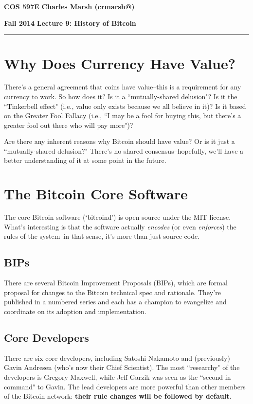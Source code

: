 \documentclass[12pt]{article}
\makeatletter
\newcommand{\myheader}[4]
{\vspace*{-0.5in}
\noindent
{#1} \hfill {#3}

\noindent
{#2} \hfill {#4}

\noindent
\rule[8pt]{\textwidth}{1pt}

\vspace{1ex} 
}  %
\newcommand{\myalgsheader}[0]
{\myheader
{ {\bf{COS 597E}} }
{ {\bf{Fall 2014}} }
{ {\bf{Charles Marsh (crmarsh@)}} }
{ {\bf{Lecture 9: History of Bitcoin}} }
}
\makeatother
\begin{document}
\myalgsheader

\pagestyle{plain}

\section*{Why Does Currency Have Value?}

There's a general agreement that coins have value--this is a requirement for any currency to work. So how does it? Is it a ``mutually-shared delusion"? Is it the ``Tinkerbell effect" (i.e., value only exists because we all believe in it)? Is it based on the Greater Fool Fallacy (i.e., ``I may be a fool for buying this, but there's a greater fool out there who will pay more")?

Are there any inherent reasons why Bitcoin should have value? Or is it just a ``mutually-shared delusion?" There's no shared consensus--hopefully, we'll have a better understanding of it at some point in the future.

\section*{The Bitcoin Core Software}

The core Bitcoin software (`bitcoind') is open source under the MIT license. What's interesting is that the software actually \textit{encodes} (or even \textit{enforces}) the rules of the system--in that sense, it's more than just source code.

\subsection*{BIPs}

There are several Bitcoin Improvement Proposals (BIPs), which are formal proposal for changes to the Bitcoin technical spec and rationale. They're published in a numbered series and each has a champion to evangelize and coordinate on its adoption and implementation.

\subsection*{Core Developers}

There are six core developers, including Satoshi Nakamoto and (previously) Gavin Andresen (who's now their Chief Scientist). The most ``researchy" of the developers is Gregory Maxwell, while Jeff Garzik was seen as the ``second-in-command" to Gavin. The lead developers are more powerful than other members of the Bitcoin network: \textbf{their rule changes will be followed by default}.
\end{document}
